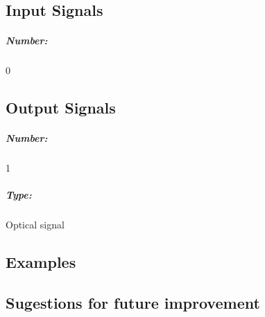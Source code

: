 \pagebreak
\subsection*{Input Signals}

\subparagraph*{Number:} 0

\subsection*{Output Signals}

\subparagraph*{Number:} 1

\subparagraph*{Type:} Optical signal

\subsection*{Examples}

\subsection*{Sugestions for future improvement}


